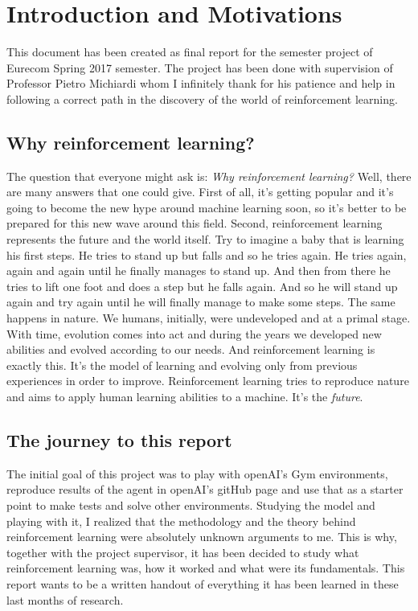 \chapter{Introduction and Motivations}
\label{chapter1}

\vspace{0.5cm}

\noindent This document has been created as final report for the semester project of Eurecom Spring 2017 semester. The project has been done with supervision of Professor Pietro Michiardi whom I infinitely thank for his patience and help in following a correct path in the discovery of the world of reinforcement learning.

\section{Why reinforcement learning?}
The question that everyone might ask is: \textit{Why reinforcement learning?} Well, there are many answers that one could give. First of all, it's getting popular and it's going to become the new hype around machine learning soon, so it's better to be prepared for this new wave around this field. Second, reinforcement learning represents the future and the world itself. Try to imagine a baby that is learning his first steps. He tries to stand up but falls and so he tries again. He tries again, again and again until he finally manages to stand up. And then from there he tries to lift one foot and does a step but he falls again. And so he will stand up again and try again until he will finally manage to make some steps. The same happens in nature. We humans, initially, were undeveloped and at a primal stage. With time, evolution comes into act and during the years we developed new abilities and evolved according to our needs. And reinforcement learning is exactly this. It's the model of learning and evolving only from previous experiences in order to improve. Reinforcement learning tries to reproduce nature and aims to apply human learning abilities to a machine. It's the \textit{future}.

\section{The journey to this report}
The initial goal of this project was to play with openAI's Gym environments, reproduce results of the agent in openAI's gitHub page and use that as a starter point to make tests and solve other environments. Studying the model and playing with it, I realized that the methodology and the theory behind reinforcement learning were absolutely unknown arguments to me. This is why, together with the project supervisor, it has been decided to study what reinforcement learning was, how it worked and what were its fundamentals. This report wants to be a written handout of everything it has been learned in these last months of research.

